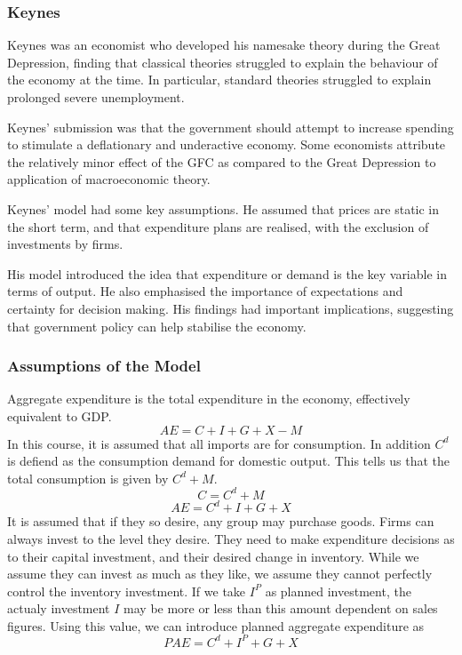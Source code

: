 \documentclass[12pt]{report}
\begin{document}
\begin{flushleft}
\subsubsection*{Keynes}

Keynes was an economist who developed his namesake theory during the 
Great Depression, finding that classical theories struggled to explain the 
behaviour of the economy at the time. In particular, standard theories 
struggled to explain prolonged severe unemployment. \par
Keynes' submission was that the government should attempt to increase spending
to stimulate a deflationary and underactive economy. Some economists attribute
the relatively minor effect of the GFC as compared to the Great Depression
to application of macroeconomic theory. \par
Keynes' model had some key assumptions. He assumed that prices are static in
the short term, and that expenditure plans are realised, with the exclusion of
investments by firms. \par
His model introduced the idea that expenditure or demand is the key 
variable in terms of output. He also emphasised the importance of expectations
and certainty for decision making. His findings had important implications,
suggesting that government policy can help stabilise the economy.

\subsubsection*{Assumptions of the Model}

Aggregate expenditure is the total expenditure in the economy, effectively
equivalent to GDP.
\[AE = C + I + G + X - M\]
In this course, it is assumed that all imports are for consumption. In addition
\(C^d\) is defiend as the consumption demand for domestic output. This tells
us that the total consumption is given by \(C^d + M\).
\[C = C^d + M\]
\[AE = C^d + I + G + X\]
It is assumed that if they so desire, any group may purchase goods. Firms can
always invest to the level they desire. They need to make expenditure decisions
as to their capital investment, and their desired change in inventory. While we
assume they can invest as much as they like, we assume they cannot perfectly 
control the inventory investment. If we take \(I^P\) as planned investment, the
actualy investment \(I\) may be more or less than this amount dependent on
sales figures. Using this value, we can introduce planned aggregate expenditure
as
\[PAE = C^d + I^P + G + X\]


\end{flushleft}
\end{document}
